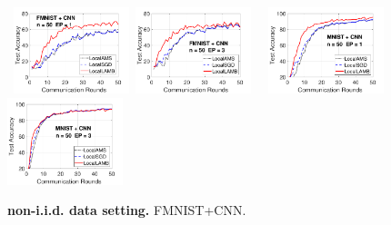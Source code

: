 \documentclass{article}
\begin{document}
 \begin{figure}[H]
    \begin{center}
            \mbox{
        \hspace{-0.05in}\includegraphics[width=0.3\textwidth]{new_fmnist_mnist_fig/fmnist_testerror_cnn_ep1_iid0.pdf}
        \hspace{-0.1in}\includegraphics[width=0.3\textwidth]{new_fmnist_mnist_fig/fmnist_testerror_cnn_ep3_iid0.pdf}
        }
        \mbox{
        \hspace{-0.05in}\includegraphics[width=0.3\textwidth]{new_fmnist_mnist_fig/mnist_testerror_cnn_ep1_iid0.pdf}
        \hspace{-0.1in}\includegraphics[width=0.3\textwidth]{new_fmnist_mnist_fig/mnist_testerror_cnn_ep3_iid0.pdf}
        }
    \end{center}
    \vspace{0.05in}
	\caption{\textbf{non-i.i.d. data setting.} FMNIST+CNN.}
	\label{fig:noniid}
	\vspace{-0.1in}
\end{figure}
  




\end{document}
